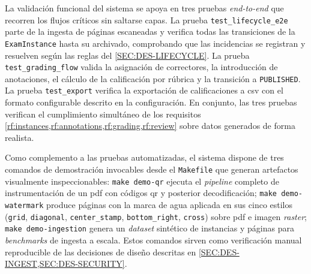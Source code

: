 La validación funcional del sistema se apoya en tres pruebas
\textit{end-to-end} que recorren los flujos críticos sin saltarse capas.
La prueba \texttt{test\_lifecycle\_e2e} parte de la ingesta de páginas
escaneadas y verifica todas las transiciones de la
\texttt{ExamInstance} hasta su archivado, comprobando que las incidencias
se registran y resuelven según las reglas del
\cref{SEC:DES-LIFECYCLE}. La prueba \texttt{test\_grading\_flow} valida
la asignación de correctores, la introducción de anotaciones, el
cálculo de la calificación por rúbrica y la transición a
\texttt{PUBLISHED}. La prueba \texttt{test\_export} verifica la
exportación de calificaciones a \acs{csv} con el formato configurable
descrito en la configuración. En conjunto, las tres pruebas
verifican el cumplimiento simultáneo de los requisitos
\cref{rf:instances,rf:annotations,rf:grading,rf:review} sobre datos
generados de forma realista.

Como complemento a las pruebas automatizadas, el sistema dispone de
tres comandos de demostración invocables desde el \texttt{Makefile} que
generan artefactos visualmente inspeccionables: \texttt{make demo-qr}
ejecuta el \textit{pipeline} completo de instrumentación de un \acs{pdf}
con códigos \acs{qr} y posterior decodificación;
\texttt{make demo-watermark} produce páginas con la marca de agua
aplicada en sus cinco estilos (\texttt{grid}, \texttt{diagonal},
\texttt{center\_stamp}, \texttt{bottom\_right}, \texttt{cross}) sobre
\acs{pdf} e imagen \textit{raster}; \texttt{make demo-ingestion} genera
un \textit{dataset} sintético de instancias y páginas para
\textit{benchmarks} de ingesta a escala. Estos comandos sirven como
verificación manual reproducible de las decisiones de diseño descritas
en \cref{SEC:DES-INGEST,SEC:DES-SECURITY}.
